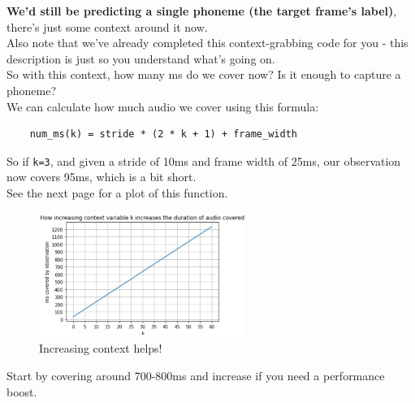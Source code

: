 \documentclass{article}
\newcommand{\ttt}[1]{\texttt{#1}}
\begin{document}
\textbf{We'd still be predicting a single phoneme (the target frame's label)}, there's just some context around it now. \\

Also note that we've already completed this context-grabbing code for you - this description is just so you understand what's going on. \\

So with this context, how many ms do we cover now? Is it enough to capture a phoneme? \\

We can calculate how much audio we cover using this formula:

\begin{verbatim}
    num_ms(k) = stride * (2 * k + 1) + frame_width
\end{verbatim}

So if \ttt{k=3}, and given a stride of 10ms and frame width of 25ms, our observation now covers 95ms, which is a bit short. \\

See the next page for a plot of this function. \\

\newpage

\begin{figure}[h]
    \centering
    \includegraphics[width=0.6\textwidth]{images/coverage.png}
    \caption{Increasing context helps!}
\end{figure}

Start by covering around 700-800ms and increase if you need a performance boost. \\
\end{document}
